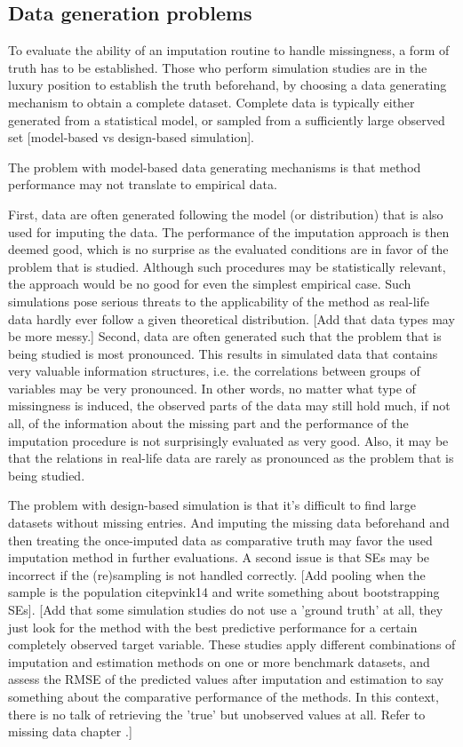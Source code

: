 \documentclass[bimj,fleqn]{w-art}
\begin{document}

\subsection{Data generation problems}

To evaluate the ability of an imputation routine to handle missingness, a form of truth has to be established. Those who perform simulation studies are in the luxury position to establish the truth beforehand, by choosing a data generating mechanism to obtain a complete dataset. Complete data is typically either generated from a statistical model, or sampled from a sufficiently large observed set [model-based vs design-based simulation]. 

The problem with model-based data generating mechanisms is that method performance may not translate to empirical data. 

First, data are often generated following the model (or distribution) that is also used for imputing the data. The performance of the imputation approach is then deemed good, which is no surprise as the evaluated conditions are in favor of the problem that is studied. Although such procedures may be statistically relevant, the approach would be no good for even the simplest empirical case. Such simulations pose serious threats to the applicability of the method as real-life data hardly ever follow a given theoretical distribution. [Add that data types may be more messy.] Second, data are often generated such that the problem that is being studied is most pronounced. This results in simulated data that contains very valuable information structures, i.e. the correlations between groups of variables may be very pronounced. In other words, no matter what type of missingness is induced, the observed parts of the data may still hold much, if not all, of the information about the missing part and the performance of the imputation procedure is not surprisingly evaluated as very good. Also, it may be that the relations in real-life data are rarely as pronounced as the problem that is being studied.

The problem with design-based simulation is that it's difficult to find large datasets without missing entries. And imputing the missing data beforehand and then treating the once-imputed data as comparative truth may favor the used imputation method in further evaluations. A second issue is that SEs may be incorrect if the (re)sampling is not handled correctly. [Add pooling when the sample is the population citep{vink14} and write something about bootstrapping SEs]. [Add that some simulation studies do not use a 'ground truth' at all, they just look for the method with the best predictive performance for a certain completely observed target variable. These studies apply different combinations of imputation and estimation methods on one or more benchmark datasets, and assess the RMSE of the predicted values after imputation and estimation to say something about the comparative performance of the methods. In this context, there is no talk of retrieving the 'true' but unobserved values at all. Refer to missing data chapter \citep{liu21}.]
\end{document}
